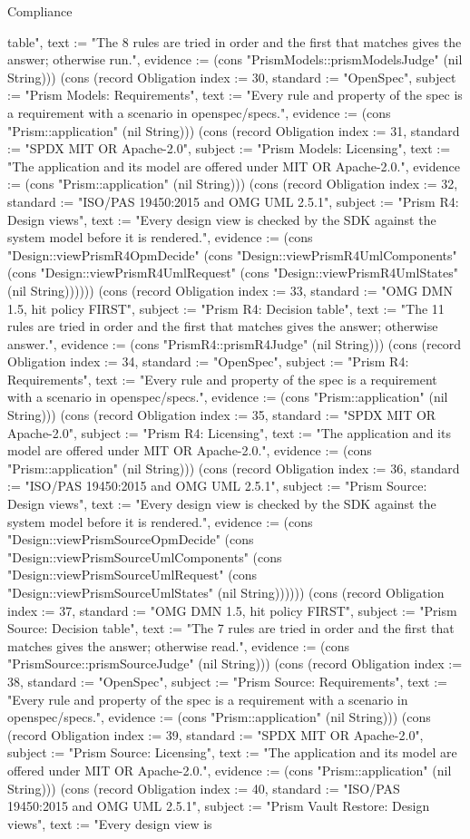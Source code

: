\begin{lexlean}{Compliance}
\begin{semanticmodule}
{table", text := "The 8 rules are tried in order and the first that matches gives the answer; otherwise run.", evidence := (cons "PrismModels::prismModelsJudge" (nil String))}) (cons (record Obligation {index := 30, standard := "OpenSpec", subject := "Prism Models: Requirements", text := "Every rule and property of the spec is a requirement with a scenario in openspec/specs.", evidence := (cons "Prism::application" (nil String))}) (cons (record Obligation {index := 31, standard := "SPDX MIT OR Apache-2.0", subject := "Prism Models: Licensing", text := "The application and its model are offered under MIT OR Apache-2.0.", evidence := (cons "Prism::application" (nil String))}) (cons (record Obligation {index := 32, standard := "ISO/PAS 19450:2015 and OMG UML 2.5.1", subject := "Prism R4: Design views", text := "Every design view is checked by the SDK against the system model before it is rendered.", evidence := (cons "Design::viewPrismR4OpmDecide" (cons "Design::viewPrismR4UmlComponents" (cons "Design::viewPrismR4UmlRequest" (cons "Design::viewPrismR4UmlStates" (nil String)))))}) (cons (record Obligation {index := 33, standard := "OMG DMN 1.5, hit policy FIRST", subject := "Prism R4: Decision table", text := "The 11 rules are tried in order and the first that matches gives the answer; otherwise answer.", evidence := (cons "PrismR4::prismR4Judge" (nil String))}) (cons (record Obligation {index := 34, standard := "OpenSpec", subject := "Prism R4: Requirements", text := "Every rule and property of the spec is a requirement with a scenario in openspec/specs.", evidence := (cons "Prism::application" (nil String))}) (cons (record Obligation {index := 35, standard := "SPDX MIT OR Apache-2.0", subject := "Prism R4: Licensing", text := "The application and its model are offered under MIT OR Apache-2.0.", evidence := (cons "Prism::application" (nil String))}) (cons (record Obligation {index := 36, standard := "ISO/PAS 19450:2015 and OMG UML 2.5.1", subject := "Prism Source: Design views", text := "Every design view is checked by the SDK against the system model before it is rendered.", evidence := (cons "Design::viewPrismSourceOpmDecide" (cons "Design::viewPrismSourceUmlComponents" (cons "Design::viewPrismSourceUmlRequest" (cons "Design::viewPrismSourceUmlStates" (nil String)))))}) (cons (record Obligation {index := 37, standard := "OMG DMN 1.5, hit policy FIRST", subject := "Prism Source: Decision table", text := "The 7 rules are tried in order and the first that matches gives the answer; otherwise read.", evidence := (cons "PrismSource::prismSourceJudge" (nil String))}) (cons (record Obligation {index := 38, standard := "OpenSpec", subject := "Prism Source: Requirements", text := "Every rule and property of the spec is a requirement with a scenario in openspec/specs.", evidence := (cons "Prism::application" (nil String))}) (cons (record Obligation {index := 39, standard := "SPDX MIT OR Apache-2.0", subject := "Prism Source: Licensing", text := "The application and its model are offered under MIT OR Apache-2.0.", evidence := (cons "Prism::application" (nil String))}) (cons (record Obligation {index := 40, standard := "ISO/PAS 19450:2015 and OMG UML 2.5.1", subject := "Prism Vault Restore: Design views", text := "Every design view is }
\end{semanticmodule}
\end{lexlean}
